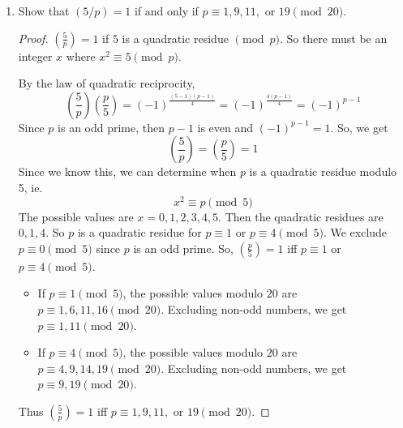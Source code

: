 \documentclass[11pt]{article}
\theoremstyle{definition}
\newcommand{\legendre}[2]{\ensuremath{\left( \frac{#1}{#2} \right) }}
\begin{document}
\begin{enumerate}
\begin{proof}
    \end{proof}

    \item Show that $(5/p)=1$ if and only if $p\equiv 1, 9, 11, \text{ or } 19 \pmod{20}$.
    \begin{proof}
        $\legendre{5}{p}=1$ if $5$ is a quadratic residue $\pmod{p}$. 
        So there must be an integer $x$ where $x^2\equiv 5\pmod{p}$. 

        By the law of quadratic reciprocity,
        \[
            \legendre{5}{p}\legendre{p}{5} = (-1)^{\frac{(5-1)(p-1)}{4}} = (-1)^{\frac{4(p-1)}{4}} = (-1)^{p-1}
        \]
        Since $p$ is an odd prime, then $p-1$ is even and $(-1)^{p-1} = 1$.
        So, we get 
        \[
            \legendre{5}{p} = \legendre{p}{5} = 1
        \]
        Since we know this, we can determine when $p$ is a quadratic residue modulo 5, ie.
        \[
            x^2\equiv p\pmod{5}
        \]
        The possible values are $x=0,1,2,3,4,5$. 
        Then the quadratic residues are $0,1,4$.
        So $p$ is a quadratic residue for $p\equiv 1$ or $p\equiv 4\pmod{5}$.
        We exclude $p\equiv 0\pmod{5}$ since $p$ is an odd prime.
        So, $\legendre{p}{5} = 1$ iff $p\equiv 1$ or $p\equiv 4\pmod{5}$. 
        \begin{itemize}
            \item If $p\equiv 1\pmod{5}$, the possible values modulo $20$ are
            $p\equiv 1,6,11,16\pmod{20}$. Excluding non-odd numbers, we get 
            $p\equiv 1,11\pmod{20}$.
            \item If $p\equiv 4\pmod{5}$, the possible values modulo $20$ are
            $p\equiv 4,9,14,19\pmod{20}$. Excluding non-odd numbers, we get 
            $p\equiv 9,19\pmod{20}$.
        \end{itemize}
        Thus $\legendre{5}{p}=1$ iff $p\equiv 1,9,11,$ or $19\pmod{20}$.

    \end{proof}


\end{enumerate}
\end{document}
